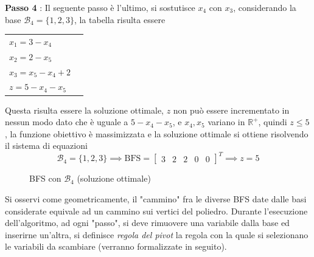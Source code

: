 \documentclass[10pt, letterpaper]{report}
\begin{document}
\textbf{Passo 4} : Il seguente passo è l'ultimo, si sostutisce $x_4$ con $x_3$, considerando la base $\mathcal B_4 = \{1,2,3\}$, la tabella risulta essere 
\begin{center}
    \begin{tabular}{|l|l|}\hline 
        $x_1=3-x_4$\\ 
        $x_2=2-x_5$\\ 
        $x_3=x_5-x_4+2$ \\
        \hline 
        $z=5-x_4-x_5$ \\\hline 
    \end{tabular}
\end{center}
Questa risulta essere la soluzione ottimale, $z$ non può essere incrementato in nessun modo dato che è uguale a $5-x_4-x_5$, e $x_4,x_5$ variano in $\mathbb R^+$, quindi $z\le 5 $, la funzione obiettivo è massimizzata e la soluzione ottimale si ottiene risolvendo il sistema di equazioni
$$ \mathcal{B}_4 = \{1,2,3\}\implies \text{BFS}=\begin{bmatrix}
    3 & 2 & 2 & 0 & 0 
\end{bmatrix}^T \implies z= 5$$
\begin{figure}[h]
    \caption{BFS con $\mathcal B_4$ (soluzione ottimale)}
\end{figure}
Si osservi come geometricamente, il "cammino" fra le diverse BFS date dalle basi considerate equivale ad un cammino sui vertici del poliedro. Durante l'esecuzione dell'algoritmo, ad ogni "passo", si deve rimuovere una variabile dalla base ed inserirne un'altra, si definisce \textit{regola del pivot} la regola con la quale si selezionano le variabili da scambiare (verranno formalizzate in seguito).
\end{document}
